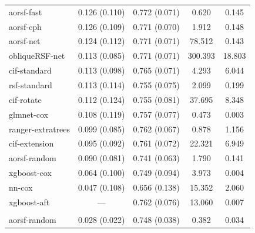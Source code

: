 \documentclass{article}\usepackage[]{graphicx}\usepackage[]{xcolor}
\newenvironment{knitrout}{}{} %
\begin{document}
\begin{knitrout}
\begin{longtable}[t]{lcccc}
\endfoot
\bottomrule
\endlastfoot
\addlinespace[0.3em]
\multicolumn{5}{l}{\textit{\textbf{Overall}}}\\
\hline
\hspace{1em}aorsf-fast & 0.126 (0.110) & 0.772 (0.071) & 0.620 & 0.145\\
\hspace{1em}aorsf-cph & 0.126 (0.109) & 0.771 (0.070) & 1.912 & 0.148\\
\hspace{1em}aorsf-net & 0.124 (0.112) & 0.771 (0.071) & 78.512 & 0.143\\
\hspace{1em}obliqueRSF-net & 0.113 (0.085) & 0.771 (0.071) & 300.393 & 18.803\\
\hspace{1em}cif-standard & 0.113 (0.098) & 0.765 (0.071) & 4.293 & 6.044\\
\hspace{1em}rsf-standard & 0.113 (0.114) & 0.755 (0.075) & 2.099 & 0.199\\
\hspace{1em}cif-rotate & 0.112 (0.124) & 0.755 (0.081) & 37.695 & 8.348\\
\hspace{1em}glmnet-cox & 0.108 (0.119) & 0.757 (0.077) & 0.473 & 0.003\\
\hspace{1em}ranger-extratrees & 0.099 (0.085) & 0.762 (0.067) & 0.878 & 1.156\\
\hspace{1em}cif-extension & 0.095 (0.092) & 0.761 (0.072) & 22.321 & 6.949\\
\hspace{1em}aorsf-random & 0.090 (0.081) & 0.741 (0.063) & 1.790 & 0.141\\
\hspace{1em}xgboost-cox & 0.064 (0.100) & 0.749 (0.094) & 3.973 & 0.004\\
\hspace{1em}nn-cox & 0.047 (0.108) & 0.656 (0.138) & 15.352 & 2.060\\
\hspace{1em}xgboost-aft & --- & 0.762 (0.076) & 13.060 & 0.007\\
\addlinespace[0.3em]
\multicolumn{5}{l}{\textit{\textbf{ACTG 320; AIDS diagnosis, n = 1151, p = 12}}}\\
\hline
\hspace{1em}aorsf-random & 0.028 (0.022) & 0.748 (0.038) & 0.382 & 0.034\\

\end{longtable}
\end{knitrout}
\end{document}
